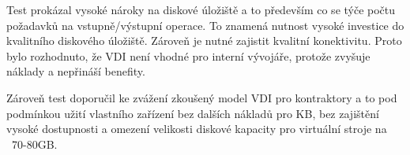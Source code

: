Test prokázal vysoké nároky na diskové úložiště a to především co se týče počtu požadavků na vstupně/výstupní operace. To znamená nutnost vysoké investice do kvalitního diskového úložiště. Zároveň je nutné zajistit kvalitní konektivitu. Proto bylo rozhodnuto, že VDI není vhodné pro interní vývojáře, protože zvyšuje náklady a nepřináší benefity.

Zároveň test doporučil ke zvážení zkoušený model VDI pro kontraktory a to pod podmínkou užití vlastního zařízení bez dalších nákladů pro KB, bez zajištění vysoké dostupnosti a omezení velikosti diskové kapacity pro virtuální stroje na ~70-80GB.





